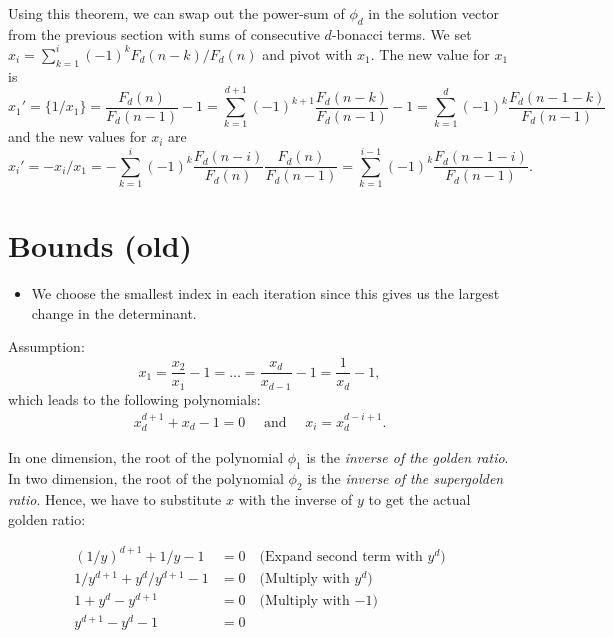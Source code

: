 \documentclass[english,version-2020-11]{uzl-thesis}
\begin{document}
Using this theorem, we can swap out the power-sum of $\phi_d$ in the solution
vector from the previous section with sums of consecutive $d$-bonacci terms.
We set $x_i = \sum_{k=1}^i (-1)^k F_d(n - k) / F_d(n)$ and pivot with $x_1$.
The new value for $x_1$ is
\[
  x_1'
  = \{1/x_1\}
  = \frac{F_d(n)}{F_d(n - 1)} - 1
  = \sum_{k=1}^{d+1} (-1)^{k + 1} \frac{F_d(n - k)}{F_d(n - 1)} - 1
  = \sum_{k=1}^d (-1)^k \frac{F_d(n - 1 - k)}{F_d(n - 1)}
\]
and the new values for $x_i$ are
\[
  x_i'
  = -x_i / x_1
  = -\sum_{k=1}^i (-1)^k \frac{F_d(n - i)}{F_d(n)} \frac{F_d(n)}{F_d(n - 1)}
  = \sum_{k=1}^{i-1} (-1)^k \frac{F_d(n - 1 - i)}{F_d(n - 1)}.
\]


\chapter{Bounds (old)}

\begin{itemize}
  \item We choose the smallest index in each iteration since this gives us the
    largest change in the determinant.
\end{itemize}

Assumption:
\[
  x_1 = \frac{x_2}{x_1} - 1 = \dots = \frac{x_{d}}{x_{d-1}} - 1 = \frac{1}{x_d} - 1,
\]
which leads to the following polynomials:
\begin{align}
  \label{eq:solution}
  x_d^{d+1} + x_d - 1 = 0 \quad \text{ and } \quad x_i = x_d^{d - i + 1}.
\end{align}

In one dimension, the root of the polynomial $\phi_1$ is the \emph{inverse of the golden ratio}.
In two dimension, the root of the polynomial $\phi_2$ is the \emph{inverse of the supergolden ratio}.
Hence, we have to substitute $x$ with the inverse of $y$ to get the actual golden ratio:

\begin{align*}
  (1/y)^{d+1} + 1/y - 1       & = 0 \quad \text{(Expand second term with $y^d$)} \\
  1/y^{d+1} + y^d/y^{d+1} - 1 & = 0 \quad \text{(Multiply with $y^d$)}           \\
  1 + y^d - y^{d+1}           & = 0 \quad \text{(Multiply with $-1$)}            \\
  y^{d+1} - y^d - 1           & = 0                                              \\
\end{align*}
\end{document}
